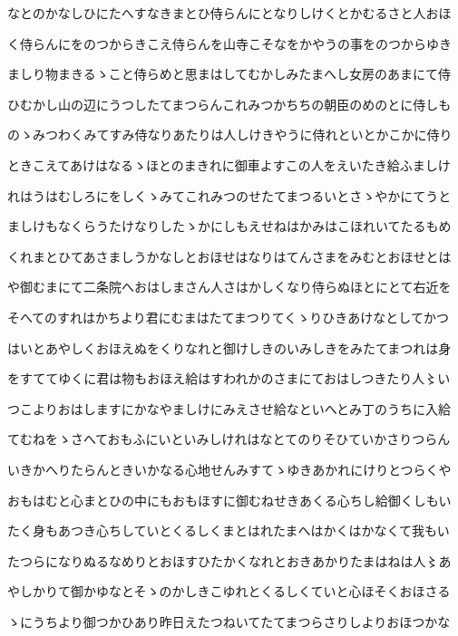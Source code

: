 \documentclass[a4paper,11pt,landscape]{ltjtarticle}
\begin{document}
\par\medskip
なとのかなしひにたへすなきまとひ侍らんにとなりしけくとかむるさと人おほ
\par\medskip
く侍らんにをのつからきこえ侍らんを山寺こそなをかやうの事をのつからゆき
\par\medskip
ましり物まきるゝこと侍らめと思まはしてむかしみたまへし女房のあまにて侍
\par\medskip
ひむかし山の辺にうつしたてまつらんこれみつかちちの朝臣のめのとに侍しも
\par\medskip
のゝみつわくみてすみ侍なりあたりは人しけきやうに侍れといとかこかに侍り
\par\medskip
ときこえてあけはなるゝほとのまきれに御車よすこの人をえいたき給ふましけ
\par\medskip
れはうはむしろにをしくゝみてこれみつのせたてまつるいとさゝやかにてうと
\par\medskip
ましけもなくらうたけなりしたゝかにしもえせねはかみはこほれいてたるもめ
\par\medskip
くれまとひてあさましうかなしとおほせはなりはてんさまをみむとおほせとは
\par\medskip
や御むまにて二条院へおはしまさん人さはかしくなり侍らぬほとにとて右近を
\par\medskip
そへてのすれはかちより君にむまはたてまつりてくゝりひきあけなとしてかつ
\par\medskip
はいとあやしくおほえぬをくりなれと御けしきのいみしきをみたてまつれは身
\par\medskip
をすててゆくに君は物もおほえ給はすわれかのさまにておはしつきたり人〻い
\par\medskip
つこよりおはしますにかなやましけにみえさせ給なといへとみ丁のうちに入給
\par\medskip
てむねをゝさへておもふにいといみしけれはなとてのりそひていかさりつらん
\par\medskip
いきかへりたらんときいかなる心地せんみすてゝゆきあかれにけりとつらくや
\par\medskip
おもはむと心まとひの中にもおもほすに御むねせきあくる心ちし給御くしもい
\par\medskip
たく身もあつき心ちしていとくるしくまとはれたまへはかくはかなくて我もい
\par\medskip
たつらになりぬるなめりとおほすひたかくなれとおきあかりたまはねは人〻あ
\par\medskip
やしかりて御かゆなとそゝのかしきこゆれとくるしくていと心ほそくおほさる
\par\medskip
ゝにうちより御つかひあり昨日えたつねいてたてまつらさりしよりおほつかな
\end{document}
